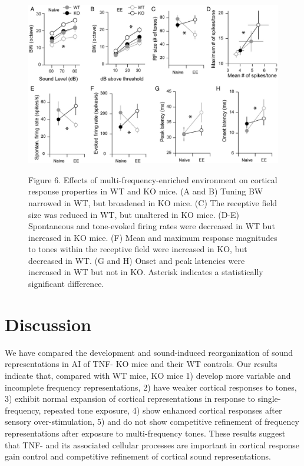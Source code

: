 \begin{figure}[h]
	\centering
		\includegraphics[width=6in]{images/C3F6}
	\begin{changemargin}{1in}{1in}
	\footnotesize{Figure 6. Effects of multi-frequency-enriched environment on cortical response properties in WT and KO mice. (A and B) Tuning BW narrowed in WT, but broadened in KO mice. (C) The receptive field size was reduced in WT, but unaltered in KO mice. (D-E) Spontaneous and tone-evoked firing rates were decreased in WT but increased in KO mice. (F) Mean and maximum response magnitudes to tones within the receptive field were increased in KO, but decreased in WT. (G and H) Onset and peak latencies were increased in WT but not in KO. Asterisk indicates a statistically significant difference.}
	\end{changemargin}
\end{figure}

\section{Discussion}

We have compared the development and sound-induced reorganization of sound representations in AI of TNF-\textalpha{} KO mice and their WT controls. Our results indicate that, compared with WT mice, KO mice 1) develop more variable and incomplete frequency representations, 2) have weaker cortical responses to tones, 3) exhibit normal expansion of cortical representations in response to single-frequency, repeated tone exposure, 4) show enhanced cortical responses after sensory over-stimulation, 5) and do not show competitive refinement of frequency representations after exposure to multi-frequency tones. These results suggest that TNF-\textalpha{} and its associated cellular processes are important in cortical response gain control and competitive refinement of cortical sound representations.

